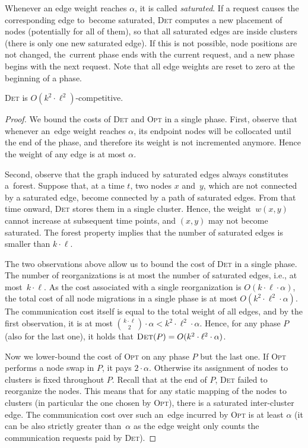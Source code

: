 \documentclass{siamart190516}
\newcommand{\OPT}{\textsc{Opt}\xspace}
\newcommand{\DET}{\textsc{Det}\xspace}
\begin{document}
Whenever an edge weight reaches $\alpha$, it is called \emph{saturated}. If a
request causes the corresponding edge to~become saturated,
\DET computes a new placement of nodes (potentially for all of them), so that all
saturated edges are inside clusters (there is only one new saturated edge). If
this is not possible, node positions are not changed, the~current phase ends
with the current request, and a new phase begins with the next request. Note
that all edge weights are reset to zero at the beginning of a phase.


\begin{theorem}
\DET is $O(k^2 \cdot \ell^2)$-competitive.
\end{theorem}

\begin{proof}
We bound the costs of \DET and \OPT in a single phase. First, observe that
whenever an~edge weight reaches $\alpha$, its endpoint nodes will be collocated 
until the end of the phase, and therefore its weight is not
incremented anymore. Hence the weight of any edge is at most $\alpha$.

Second, observe that the graph induced by saturated edges always constitutes 
a~forest. Suppose that, at a time $t$,
two nodes $x$ and~$y$, which are not
connected by a saturated edge, become connected by a path of saturated edges.
From that time onward, \DET stores them in a single cluster. Hence, the
weight~$w(x,y)$ cannot increase at subsequent time points, and $(x,y)$ may
not become saturated. The forest property implies that the number of saturated
edges is smaller than $k \cdot \ell$.

The two observations above allow us to bound the cost of \DET in a single
phase. The number of reorganizations is at most the number of saturated edges,
i.e., at most~$k \cdot \ell$. As the cost associated with a single
reorganization is $O(k \cdot \ell \cdot \alpha)$, the total cost of all node
migrations in a single phase is at most $O(k^2 \cdot \ell^2 \cdot \alpha)$.
The communication cost itself is equal to the total weight of all edges, and
by the first observation, it is at most $\binom{k \cdot \ell}{2}
\cdot \alpha < k^2 \cdot \ell^2 \cdot \alpha$. Hence, for any phase $P$ (also
for the last one), it holds that $\DET(P) = O(k^2 \cdot \ell^2 \cdot \alpha)$.

Now we lower-bound the cost of \OPT on any phase $P$ but the last one. If \OPT
performs a node swap in $P$, it pays $2 \cdot \alpha$. Otherwise its assignment of
nodes to clusters is fixed throughout $P$. Recall that at the end of $P$, \DET
failed to reorganize the nodes. This means that for any static mapping of the
nodes to clusters (in particular the one chosen by \OPT), there is a
saturated inter-cluster edge. The communication cost over such an~edge incurred
by \OPT is at least $\alpha$ (it can be also strictly greater than~$\alpha$ as
the edge weight only counts the communication requests paid by \DET).


\end{proof}
\end{document}
